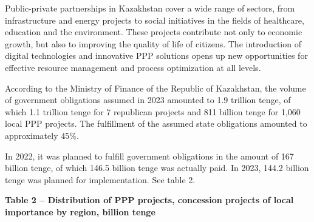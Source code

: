 
Public-private partnerships in Kazakhstan cover a wide range of sectors,
from infrastructure and energy projects to social initiatives in the
fields of healthcare, education and the environment. These projects
contribute not only to economic growth, but also to improving the
quality of life of citizens. The introduction of digital technologies
and innovative PPP solutions opens up new opportunities for effective
resource management and process optimization at all levels.

According to the Ministry of Finance of the Republic of Kazakhstan, the
volume of government obligations assumed in 2023 amounted to 1.9
trillion tenge, of which 1.1 trillion tenge for 7 republican projects
and 811 billion tenge for 1,060 local PPP projects. The fulfillment of
the assumed state obligations amounted to approximately 45\%.

In 2022, it was planned to fulfill government obligations in the amount
of 167 billion tenge, of which 146.5 billion tenge was actually paid. In
2023, 144.2 billion tenge was planned for implementation. See table 2.

{\bfseries Table 2 -- Distribution of PPP projects, concession projects of
local importance by region, billion tenge}

